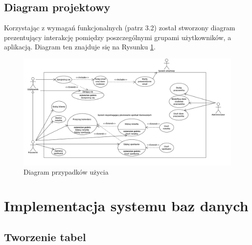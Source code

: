 \documentclass[eng,printmode,openany,oneside]{mgr}
\begin{document}
	

\section{Diagram projektowy}

Korzystając z wymagań funkcjonalnych (patrz 3.2) został stworzony diagram prezentujący interakcję pomiędzy poszczególnymi grupami użytkowników, a aplikacją. Diagram ten znajduje się na Rysunku \ref{fig:14}.

\begin{figure}[H]
	\centering
	\includegraphics[width=1\textwidth]{diagram}
	\caption{Diagram przypadków użycia}
	\label{fig:14}
\end{figure}







\chapter{Implementacja systemu baz danych}
\section{Tworzenie tabel}
\end{document}
